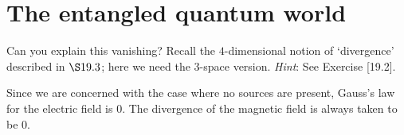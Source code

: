 \documentclass[../road-to-reality.tex]{subfiles}
\begin{document}
	\printanswers
	
	\section{The entangled quantum world}
	
	\begin{questions}
		\question Can you explain this vanishing? Recall the $4$-dimensional notion of `divergence' described in $\S19.3$; here we need the $3$-space version. \textit{Hint}: See Exercise [19.2].
		
		\begin{solution}
			Since we are concerned with the case where no sources are present, Gauss's law for the electric field is $0$. The divergence of the magnetic field is always taken to be $0$.
		\end{solution}
	
	
	\end{questions}
\end{document}
